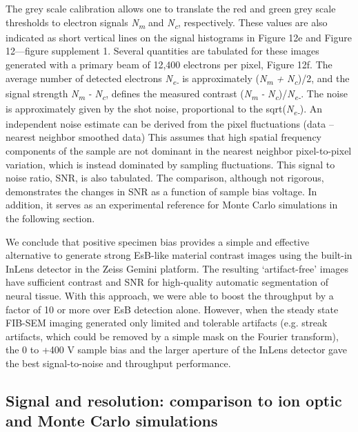 \documentclass{article}
\begin{document}
The grey scale calibration allows one to translate the red and green grey scale thresholds to electron signals \emph{N\textsubscript{m}} and \emph{N\textsubscript{c}}, respectively. These values are also indicated as short vertical lines on the signal histograms in Figure 12e and Figure 12—figure supplement 1. Several quantities are tabulated for these images generated with a primary beam of 12,400 electrons per pixel, Figure 12f. The average number of detected electrons \emph{N\textsubscript{e-}} is approximately (\emph{N\textsubscript{m}} \emph{+ }\emph{N\textsubscript{c}})/2, and the signal strength \emph{N\textsubscript{m}} \emph{-} \emph{N\textsubscript{c}}, defines the measured contrast (\emph{N\textsubscript{m}} \emph{- }\emph{N\textsubscript{c}})/\emph{N\textsubscript{e-}}. The noise is approximately given by the shot noise, proportional to the sqrt(\emph{N\textsubscript{e-}}). An independent noise estimate can be derived from the pixel fluctuations (data – nearest neighbor smoothed data) This assumes that high spatial frequency components of the sample are not dominant in the nearest neighbor pixel-to-pixel variation, which is instead dominated by sampling fluctuations. This signal to noise ratio, SNR, is also tabulated. The comparison, although not rigorous, demonstrates the changes in SNR as a function of sample bias voltage. In addition, it serves as an experimental reference for Monte Carlo simulations in the following section.

We conclude that positive specimen bias provides a simple and effective alternative to generate strong EsB-like material contrast images using the built-in InLens detector in the Zeiss Gemini platform. The resulting ‘artifact-free’ images have sufficient contrast and SNR for high-quality automatic segmentation of neural tissue. With this approach, we were able to boost the throughput by a factor of 10 or more over EsB detection alone. However, when the steady state FIB-SEM imaging generated only limited and tolerable artifacts (e.g. streak artifacts, which could be removed by a simple mask on the Fourier transform), the 0 to +400 V sample bias and the larger aperture of the InLens detector gave the best signal-to-noise and throughput performance.

\subsection*{Signal and resolution: comparison to ion optic and Monte Carlo simulations}
\end{document}
